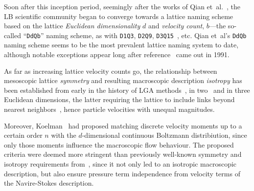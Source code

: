     Soon after this inception period, seemingly after the works of Qian  et~al.~\cite{1991-QianYH+LallemandP-AdvKinTheoContMech,
    1992-QianYH+LallemandP-EurophysLett}, the LB scientific community began to converge towards a lattice naming scheme based on
    the lattice \emph{Euclidean dimensionality} $d$ and \emph{velocity  count},  $b$---the  so-called  ``\texttt{DdQb}''  naming
    scheme, as with \texttt{D1Q3}, \texttt{D2Q9}, \texttt{D3Q15}~\cite{1992-QianYH+LallemandP-EurophysLett}, etc.  Qian  et~al's
    \texttt{DdQb} naming scheme seems to be the most prevalent lattice naming system to date, although notable exceptions appear
    long after reference~\cite{1991-QianYH+LallemandP-AdvKinTheoContMech} came out in 1991.

    As far as increasing lattice velocity counts go, the relationship between mesoscopic lattice \emph{symmetry}  and  resulting
    macroscopic   description   \emph{isotropy}   has   been   established    from    early    in    the    history    of    LGA
    methods~\cite{1973-HardyJ+PazzisO-JMathPhys, 1976-HardyJ+PomeauY-PhysRevA},  in  two~\cite{1986-FrischU+PomeauY-PhysRevLett}
    and  in  three  Euclidean   dimensions,   the   latter   requiring   the   lattice   to   include   links   beyond   nearest
    neighbors~\cite[pp.~473,490]{1986-WolframS-JStatPhys}, hence particle velocities with unequal magnitudes.

    Moreover, Koelman~\cite{1991-KoelmanJMVA-EurophysLett} had proposed matching discrete velocity moments up to a certain order
    $n$ with the $d$-dimensional continuous Boltzmann distribiution, since only those moments  influence  the  macroscopic  flow
    behaviour. The proposed criteria were deemed more stringent than previously well-known symmetry  and  isotropy  requirements
    from~\cite{1986-WolframS-JStatPhys}, since it not only led to an isotropic macroscopic description, but also ensure pressure
    term independence from velocity terms of the Navire-Stokes description.






